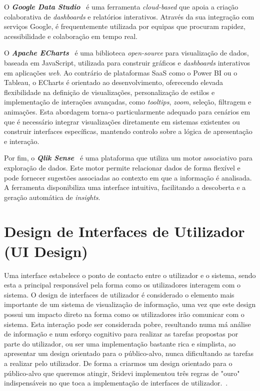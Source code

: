 O \textbf{\textit{Google Data Studio}}~\cite{googleStudio} é uma ferramenta \textit{cloud-based} que apoia a criação colaborativa de \textit{dashboards} e relatórios interativos. Através da sua integração com serviços Google, é frequentemente utilizada por equipas que procuram rapidez, acessibilidade e colaboração em tempo real.

O \textbf{\textit{Apache ECharts}}~\cite{echarts} é uma biblioteca \textit{open-source} para visualização de dados, baseada em JavaScript, utilizada para construir gráficos e \textit{dashboards} interativos em aplicações \textit{web}. Ao contrário de plataformas \gls{SaaS} como o Power BI ou o Tableau, o ECharts é orientado ao desenvolvimento, oferecendo elevada flexibilidade na definição de visualizações, personalização de estilos e implementação de interações avançadas, como \textit{tooltips}, \textit{zoom}, seleção, filtragem e animações. Esta abordagem torna-o particularmente adequado para cenários em que é necessário integrar visualizações diretamente em sistemas existentes ou construir interfaces específicas, mantendo controlo sobre a lógica de apresentação e interação.

Por fim, o \textbf{\textit{Qlik Sense}}~\cite{qlik} é uma plataforma que utiliza um motor associativo para exploração de dados. Este motor permite relacionar dados de forma flexível e pode fornecer sugestões associadas ao contexto em que a informação é analisada. A ferramenta disponibiliza uma interface intuitiva, facilitando a descoberta e a geração automática de \textit{insights}.

\section{Design de Interfaces de Utilizador (UI Design)} %
\label{sec:ui_design}

Uma interface estabelece o ponto de contacto entre o utilizador e o sistema, sendo esta a principal responsável pela forma como os utilizadores interagem com o sistema. O design de interfaces de utilizador é considerado o elemento mais importante de um sistema de visualização de informação, uma vez que este design possui um impacto direto na forma como os utilizadores irão comunicar com o sistema. Esta interação pode ser considerada pobre, resultando numa má análise de informação e num esforço cognitivo para realizar as tarefas propostas por parte do utilizador, ou ser uma implementação bastante rica e simplista, ao apresentar um design orientado para o público-alvo, nunca dificultando as tarefas a realizar pelo utilizador. De forma a criarmos um design orientado para o público-alvo que queremos atingir, Sridevi implementou três regras de "ouro" indispensáveis no que toca a implementação de interfaces de utilizador.~\cite{sridevi2014user}.

